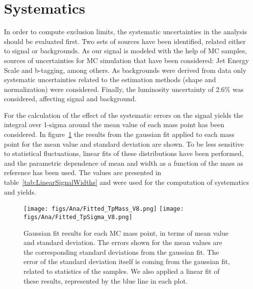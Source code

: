 \section{Systematics}
\label{sec:sys}

In order to compute exclusion limits, the systematic uncertainties in the analysis should be evaluated first. Two sets of sources have been identified, related either to signal or backgrounds. As our signal is modeled with the help of MC samples, sources of uncertainties for MC simulation that have been considered: Jet Energy Scale and b-tagging, among others. As backgrounds were derived from data only systematic uncertainties related to the estimation methods (shape and normalization) were considered. Finally, the luminosity uncertainty of 2.6\% was considered, affecting signal and background. 

For the calculation of the effect of the systematic errors on the signal yields the integral over 1-sigma around the mean value of each mass point has been considered. In figure~\ref{fig:LinearFitMeanSigma} the results from the gaussian fit applied to each mass point for the mean value and standard deviation are shown. To be less sensitive to statistical fluctuations, linear fits of these distributions have been performed, and the parametric dependence of mean and width as a function of the mass as reference has been used. The values are presented in table~\ref{tab:LinearSignalWidths} and were used for the computation of systematics and yields.

\begin{figure}[!Hhtbp]
  \begin{center}
    \texttt{[image: figs/Ana/Fitted\_TpMass\_V8.png]}
    \texttt{[image: figs/Ana/Fitted\_TpSigma\_V8.png]}
    \caption{Gaussian fit results for each MC mass point, in terms of mean value and standard deviation. The errors shown for the mean values are the corresponding standard deviations from the gaussian fit. The error of the standard deviation itself is coming from the gaussian fit, related to statistics of the samples. We also applied a linear fit of these results, represented by the blue line in each plot.}
    \label{fig:LinearFitMeanSigma}
  \end{center}
\end{figure}

